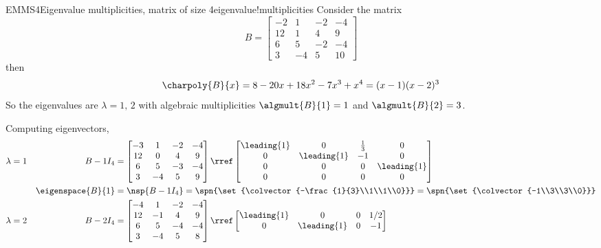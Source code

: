 \begin{example}{EMMS4}{Eigenvalue multiplicities, matrix of size 4}{eigenvalue!multiplicities}
Consider the matrix
%
\begin{equation*}
B=
\begin{bmatrix}
-2 & 1 & -2 & -4\\
12 & 1 & 4 & 9\\
6 & 5 & -2 & -4\\
3 & -4 & 5 & 10
\end{bmatrix}
\end{equation*}
%
then
%
\begin{equation*}
\charpoly{B}{x}=8-20x+18x^2-7x^3+x^4=(x-1)(x-2)^3
\end{equation*}
%
So the eigenvalues are $\lambda=1,\,2$ with algebraic multiplicities $\algmult{B}{1}=1$ and $\algmult{B}{2}=3$.\par
%
Computing eigenvectors,
%
\begin{align*}
\lambda&=1&B- 1I_4&=
\begin{bmatrix}
-3 & 1 & -2 & -4\\
12 & 0 & 4 & 9\\
6 & 5 & -3 & -4\\
3 & -4 & 5 & 9
\end{bmatrix}
\rref
\begin{bmatrix}
\leading{1} & 0 & \frac{1}{3} & 0\\
0 & \leading{1} & -1 & 0\\
0 & 0 & 0 & \leading{1}\\
0 & 0 & 0 & 0
\end{bmatrix}\\
&&\eigenspace{B}{1}&=\nsp{B-1I_4}
=\spn{\set{\colvector{-\frac{1}{3}\\1\\1\\0}}}
=\spn{\set{\colvector{-1\\3\\3\\0}}}\\
%
\lambda&=2&B-2I_4&=
\begin{bmatrix}
-4 & 1 & -2 & -4\\
12 & -1 & 4 & 9\\
6 & 5 & -4 & -4\\
3 & -4 & 5 & 8
\end{bmatrix}
\rref
\begin{bmatrix}
\leading{1} & 0 & 0 & 1/2\\
0 & \leading{1} & 0 & -1\\

\end{bmatrix}
\end{align*}
\end{example}
